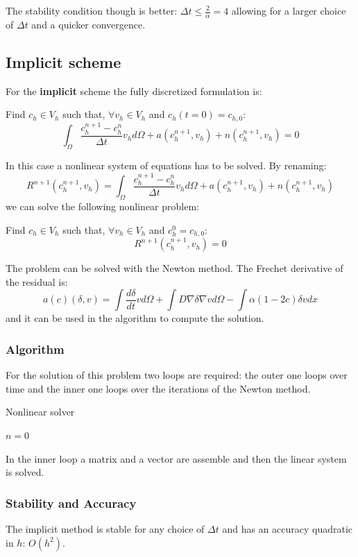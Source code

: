 \documentclass[12pt, letterpaper]{article}
\begin{document}
\noindent The stability condition though is better: $\Delta t\leq\frac2\alpha=4$ allowing for a larger choice of $\Delta t$ and a quicker convergence.

\subsection{Implicit scheme}
For the \textbf{implicit} scheme the fully discretized formulation is:

\vspace{1em}
\noindent
Find $c_h\in V_h$ such that, $\forall v_h\in V_h$ and $c_h(t=0)=c_{h,0}$:
$$\int_\Omega\frac{c_h^{n+1}-c_h^n}{\Delta t}v_hd\Omega+a(c_h^{n+1},v_h)+n(c_h^{n+1},v_h)=0$$

\noindent In this case a nonlinear system of equations has to be solved. By renaming:
$$
R^{n+1}(c_h^{n+1},v_h)=\int_\Omega\frac{c_h^{n+1}-c_h^n}{\Delta t}v_hd\Omega+a(c_h^{n+1},v_h)+n(c_h^{n+1},v_h)
$$
we can solve the following nonlinear problem:

\noindent Find $c_h\in V_h$ such that, $\forall v_h\in V_h$ and $c_h^0=c_{h,0}$:
$$
R^{n+1}(c_h^{n+1},v_h)=0
$$

\noindent The problem can be solved with the Newton method. The Frechet derivative of the residual is:
$$
a(c)(\delta, v)=\int\frac{d\delta}{dt}vd\Omega+\int D\nabla\delta\nabla vd\Omega-\int\alpha(1-2c)\delta vdx
$$
and it can be used in the algorithm to compute the solution.

\subsubsection{Algorithm}
For the solution of this problem two loops are required: the outer one loops over time and the inner one loops over the iterations of the Newton method.

\begin{algorithm}
    \caption{Nonlinear solver}

    $n = 0$\;
\end{algorithm}
\noindent In the inner loop a matrix and a vector are assemble and then the linear system is solved. 

\subsubsection{Stability and Accuracy}
The implicit method is stable for any choice of $\Delta t$ and has an accuracy quadratic in $h$: $O(h^2)$.
\end{document}
